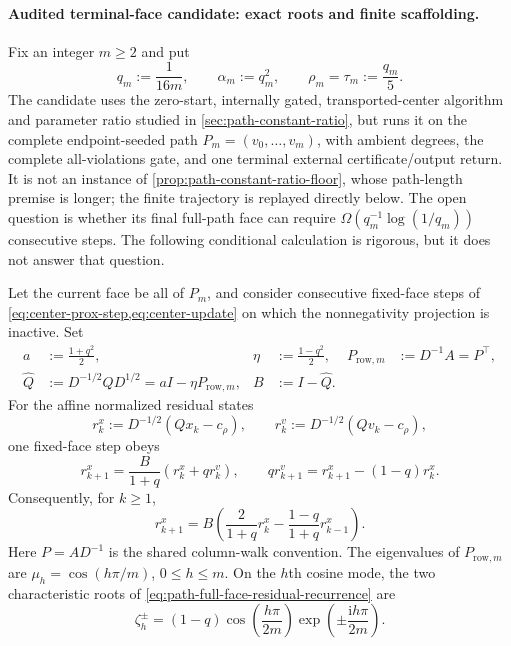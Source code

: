 \paragraph{Audited terminal-face candidate: exact roots and finite scaffolding.}
Fix an integer $m\geq2$ and put
\begin{equation}
 q_m:=\frac1{16m},
 \qquad
 \alpha_m:=q_m^2,
 \qquad
 \rho_m=\tau_m:=\frac{q_m}{5}.
 \label{eq:path-terminal-candidate-parameters}
\end{equation}
The candidate uses the zero-start, internally gated, transported-center
algorithm and parameter ratio studied in \cref{sec:path-constant-ratio}, but
runs it on the complete endpoint-seeded path
$P_m=(v_0,\ldots,v_m)$, with ambient degrees, the complete all-violations
gate, and one terminal external certificate/output return.  It is not an
instance of \cref{prop:path-constant-ratio-floor}, whose path-length premise
is longer; the finite trajectory is replayed directly below.
The open question is whether its final full-path face can require
$\Omega(q_m^{-1}\log(1/q_m))$ consecutive steps.  The following conditional
calculation is rigorous, but it does not answer that question.

\begin{lemma}
\label{lem:path-full-face-linearized-roots}
Let the current face be all of $P_m$, and consider consecutive fixed-face
steps of \cref{eq:center-prox-step,eq:center-update} on which the
nonnegativity projection is inactive.  Set
\begin{equation*}
 \begin{aligned}
 a&:=\frac{1+q^2}{2},
 &\eta&:=\frac{1-q^2}{2},
 &P_{\mathrm{row},m}&:=D^{-1}A=P^\top,\\
 \widehat Q&:=D^{-1/2}QD^{1/2}
             =aI-\eta P_{\mathrm{row},m},
 &B&:=I-\widehat Q.
 \end{aligned}
\end{equation*}
For the affine normalized residual states
\[
 r_k^x:=D^{-1/2}(Qx_k-c_\rho),
 \qquad
 r_k^v:=D^{-1/2}(Qv_k-c_\rho),
\]
one fixed-face step obeys
\begin{equation}
 r_{k+1}^x
 =\frac{B}{1+q}(r_k^x+q r_k^v),
 \qquad
 q r_{k+1}^v=r_{k+1}^x-(1-q)r_k^x.
 \label{eq:path-full-face-two-state}
\end{equation}
Consequently, for $k\geq1$,
\begin{equation}
 r_{k+1}^x
 =B\left(
   \frac{2}{1+q}r_k^x
   -\frac{1-q}{1+q}r_{k-1}^x
 \right).
 \label{eq:path-full-face-residual-recurrence}
\end{equation}
Here $P=AD^{-1}$ is the shared column-walk convention.  The eigenvalues of
$P_{\mathrm{row},m}$ are
$\mu_h=\cos(h\pi/m)$, $0\leq h\leq m$.  On the $h$th cosine mode, the two
characteristic roots of \cref{eq:path-full-face-residual-recurrence} are
\begin{equation}
 \zeta_h^\pm
 =(1-q)\cos\!\left(\frac{h\pi}{2m}\right)
  \exp\!\left(\pm\frac{\mathrm i h\pi}{2m}\right).
 \label{eq:path-full-face-linearized-roots}
\end{equation}
\end{lemma}

